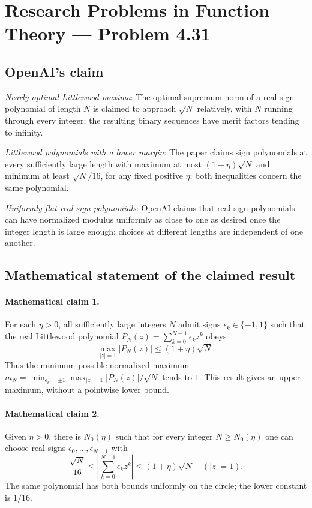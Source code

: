 \documentclass[11pt]{article}
\begin{document}
\section*{Research Problems in Function Theory — Problem 4.31}

\subsection{OpenAI's claim}
\textit{Nearly optimal Littlewood maxima}: The optimal supremum norm of a real sign polynomial of length $N$ is claimed to approach $\sqrt N$ relatively, with $N$ running through every integer; the resulting binary sequences have merit factors tending to infinity.

\textit{Littlewood polynomials with a lower margin}: The paper claims sign polynomials at every sufficiently large length with maximum at most $(1+\eta)\sqrt N$ and minimum at least $\sqrt N/16$, for any fixed positive $\eta$; both inequalities concern the same polynomial.

\textit{Uniformly flat real sign polynomials}: OpenAI claims that real sign polynomials can have normalized modulus uniformly as close to one as desired once the integer length is large enough; choices at different lengths are independent of one another.

\subsection{Mathematical statement of the claimed result}
\paragraph{Mathematical claim 1.} For each $\eta>0$, all sufficiently large integers $N$ admit signs $\epsilon_k\in\{-1,1\}$ such that the real Littlewood polynomial $P_N(z)=\sum_{k=0}^{N-1}\epsilon_kz^k$ obeys \[\max_{|z|=1}|P_N(z)|\le(1+\eta)\sqrt N.\] Thus the minimum possible normalized maximum $m_N=\min_{\epsilon_k=\pm1}\max_{|z|=1}|P_N(z)|/\sqrt N$ tends to $1$. This result gives an upper maximum, without a pointwise lower bound.

\paragraph{Mathematical claim 2.} Given $\eta>0$, there is $N_0(\eta)$ such that for every integer $N\ge N_0(\eta)$ one can choose real signs $\epsilon_0,\ldots,\epsilon_{N-1}$ with \[\frac{\sqrt N}{16}\le\left|\sum_{k=0}^{N-1}\epsilon_kz^k\right|\le(1+\eta)\sqrt N\quad(|z|=1).\] The same polynomial has both bounds uniformly on the circle; the lower constant is $1/16$.
\end{document}
